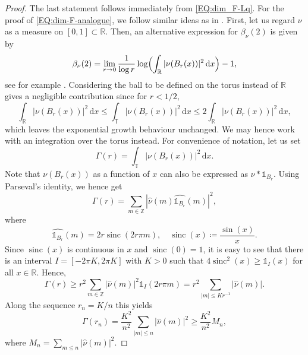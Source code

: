 \documentclass[11pt,reqno]{amsart}
\theoremstyle{plain}
\theoremstyle{definition}
\newcommand{\Z}{{\mathbb Z}}
\newcommand{\R}{{\mathbb R}}
\newcommand{\T}{{\mathbb T}}
\newcommand{\dd}{\,\mathrm{d}}
\newcommand{\sinc}{\operatorname{sinc}}
\begin{document}
\begin{proof}
The last statement follows immediately from \eqref{EQ:dim_F-Lq}. For the proof of \eqref{EQ:dim-F-analogue}, we follow similar ideas as in \cite{GH}.
First, let us regard $\nu$ as a measure on $[0,1] \subset \R$. Then, an alternative expression for $\beta_{\nu}(2)$ is given by
\[
\beta_{\nu}(2) = \lim_{r \to 0}  \frac{1}{\log r}  \log \Bigl( \int_{\R} |\nu(B_r(x))|^2 \dd x \Bigr) - 1,
\]
see for example \cite[Thm.~6.2]{Strichartz}. Considering the ball to be defined on the torus instead of $\R$ 
gives a negligible contribution since for $r < 1/2$,
\[
\int_{\R} |\nu(B_r(x))|^2 \dd x 
\leqslant  \int_{\T} |\nu(B_r(x))|^2 \dd x 
\leqslant 2 \int_{\R} |\nu(B_r(x))|^2 \dd x,
\]
which leaves the exponential growth behaviour unchanged. We may hence work with an integration over the torus instead. 
For convenience of notation, let us set
\[
\Gamma(r) = \int_{\T} |\nu(B_r(x))|^2 \dd x.
\]
Note that $\nu(B_r(x))$ as a function of $x$ can also be expressed as $\nu \ast \mathds{1}_{B_r}$. Using Parseval's identity, we hence get
\[
\Gamma(r) = \sum_{m \in \Z} |\widehat{\nu}(m) \widehat{\mathds{1}_{B_r}}(m)|^2,
\]
where 
\[
\widehat{\mathds{1}_{B_r}}(m) = 2r \sinc(2r \pi m), 
\quad \sinc(x) \coloneqq\frac{\sin(x)}{x}.
\]
Since $\sinc(x)$ is continuous in $x$ and $\sinc(0) =1$, it is easy to see that there is an interval $I = [-2 \pi K, 2 \pi K]$ with $K > 0$ such that $4 \sinc^2 (x) \geqslant \mathds{1}_I(x)$ for all $x \in \R$. Hence,
\[
\Gamma(r) \geqslant r^2 \sum_{m \in \Z} |\widehat{\nu}(m)|^2 \mathds{1}_{I}(2 r \pi m)
= r^2 \sum_{|m| \leqslant Kr^{-1}} |\widehat{\nu}(m)|.
\]
Along the sequence $r_n = K/n$ this yields
\[
\Gamma(r_n) = \frac{K^2}{n^2} \sum_{|m| \leqslant n} |\widehat{\nu}(m)|^2 \geqslant \frac{K^2}{n^2} M_n,
\]
where $M_n=\sum_{m \leqslant n} |\widehat{\nu}(m)|^2$.


\end{proof}
\end{document}
